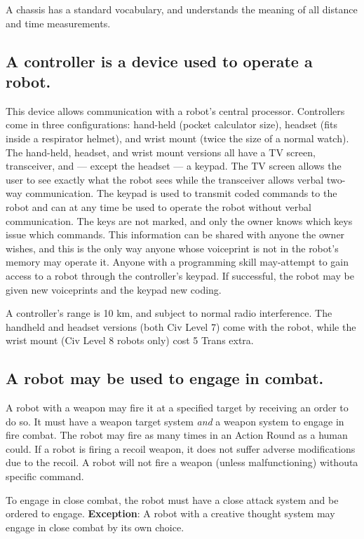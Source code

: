 A chassis has a standard vocabulary, and understands the meaning of
all distance and time measurements.

\subsection[Robot Controllers]{A controller is a device used to
  operate a robot.}
\label{sec:robot-controllers}

This device allows communication with a robot's central processor.
Controllers come in three configurations: hand-held (pocket calculator
size), headset (fits inside a respirator helmet), and wrist mount
(twice the size of a normal watch). The hand-held, headset, and wrist
mount versions all have a TV screen, transceiver, and --- except the
headset --- a keypad. The TV screen allows the user to see exactly
what the robot sees while the transceiver allows verbal two-way
communication. The keypad is used to transmit coded commands to the
robot and can at any time be used to operate the robot without verbal
communication. The keys are not marked, and only the owner knows which
keys issue which commands. This information can be shared with anyone
the owner wishes, and this is  the only way anyone whose voiceprint
is not in the robot's memory may operate it. Anyone with a programming
skill may-attempt to gain access to a robot through the controller's
keypad. If successful, the robot may be given new voiceprints and the
keypad new coding.

A controller's range is 10 km, and subject to normal radio
interference. The handheld and headset versions (both Civ Level 7)
come with the robot, while the wrist mount (Civ Level 8 robots only)
cost 5 Trans extra.

\subsection[Robot Combat]{A robot may be used to engage in combat.}
\label{sec:robot-combat}

A robot with a weapon may fire it at a specified target by receiving
an order to do so. It must have a weapon target system \emph{and} a weapon
system to engage in fire combat. The robot may fire as many times in
an Action Round as a human could. If a robot is firing a recoil
weapon, it does not suffer adverse modifications due to the recoil. A
robot will not fire a weapon (unless malfunctioning) withouta specific
command.

To engage in close combat, the robot must have a close attack system
and be ordered to engage.  \textbf{Exception}: A robot with a creative
thought system may engage in close combat by its own choice.

